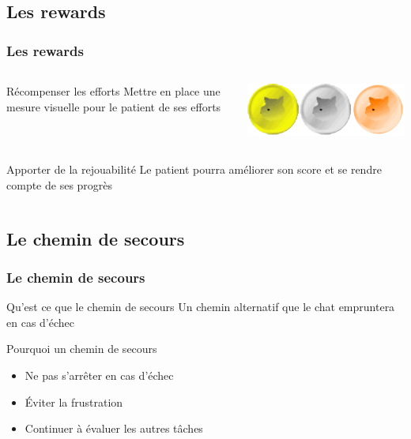 \documentclass{beamer}
\begin{document}
\subsection{Les rewards}
\begin{frame}
\frametitle{Les rewards}

\begin{columns}
	\begin{column}{0.8\textwidth}
		\begin{block}{Récompenser les efforts}
			Mettre en place une mesure visuelle pour le patient de ses efforts
		\end{block}
	\end{column}
	\pause
	\begin{column}{0.2\textwidth}
		\includegraphics[scale=0.2]{images/coins.png}
	\end{column}
\end{columns}
\begin{columns}
	\pause
	\begin{column}{0.8\textwidth}
		\begin{block}{Apporter de la rejouabilité}
			Le patient pourra améliorer son score et se rendre compte de ses progrès
		\end{block}
	\end{column}
	\begin{column}{0.2\textwidth}
	\end{column}
\end{columns}

\end{frame}


\subsection{Le chemin de secours}

\begin{frame}
\frametitle{Le chemin de secours}

\begin{block}{Qu'est ce que le chemin de secours}
Un chemin alternatif que le chat empruntera en cas d'échec
\end{block}
\pause
\begin{block}{Pourquoi un chemin de secours}
\begin{itemize}
\pause
\item Ne pas s'arrêter en cas d'échec \pause
\item Éviter la frustration \pause
\item Continuer à évaluer les autres tâches
\end{itemize}
\end{block}

\end{frame}
\end{document}
